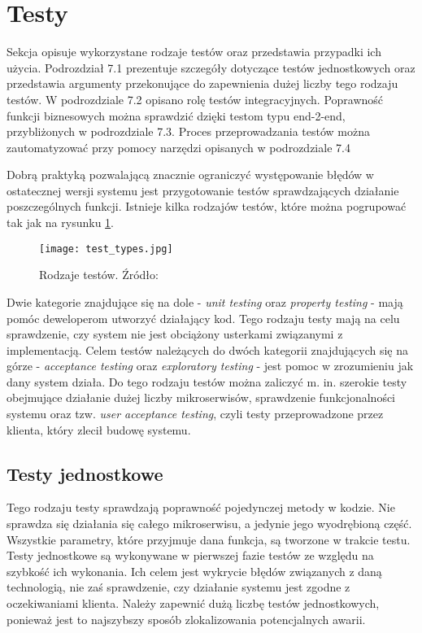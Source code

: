 \newpage
\section{Testy}
Sekcja opisuje wykorzystane rodzaje testów oraz przedstawia przypadki ich użycia.
Podrozdział 7.1 prezentuje szczegóły dotyczące testów jednostkowych oraz
przedstawia argumenty przekonujące do zapewnienia dużej liczby tego rodzaju testów.
W podrozdziale 7.2 opisano rolę testów integracyjnych. Poprawność funkcji biznesowych
można sprawdzić dzięki testom typu end-2-end, przybliżonych w podrozdziale 7.3.
Proces przeprowadzania testów można zautomatyzować przy pomocy narzędzi opisanych
w podrozdziale 7.4

Dobrą praktyką pozwalającą znacznie ograniczyć występowanie błędów w ostatecznej 
wersji systemu jest przygotowanie testów sprawdzających działanie poszczególnych 
funkcji. Istnieje kilka rodzajów testów, które można pogrupować tak jak na rysunku
\ref{fig:test-types}.

\begin{figure}[h]
    \centering
    \texttt{[image: test\_types.jpg]}
    \caption{Rodzaje testów. Źródło: \cite{newman2015}}
    \label{fig:test-types}
\end{figure}

Dwie kategorie znajdujące się na dole - \textit{unit testing} oraz \textit{property testing} - mają 
pomóc deweloperom utworzyć działający kod. Tego rodzaju testy mają na celu 
sprawdzenie, czy system nie jest obciążony usterkami związanymi z implementacją. 
Celem testów należących do dwóch kategorii znajdujących się na górze - \textit{acceptance 
testing} oraz \textit{exploratory testing} - jest pomoc w zrozumieniu jak dany system działa. 
Do tego rodzaju testów można zaliczyć m. in. szerokie testy obejmujące działanie dużej 
liczby mikroserwisów, sprawdzenie funkcjonalności systemu oraz tzw. \textit{user acceptance 
testing}, czyli testy przeprowadzone przez klienta, który zlecił budowę systemu.

\subsection{Testy jednostkowe}

Tego rodzaju testy sprawdzają poprawność pojedynczej metody w kodzie. Nie sprawdza się działania 
się całego mikroserwisu, a jedynie jego wyodrębioną część. Wszystkie parametry, które 
przyjmuje dana funkcja, są tworzone w trakcie testu. Testy jednostkowe są wykonywane 
w pierwszej fazie testów ze względu na szybkość ich wykonania. Ich celem jest wykrycie 
błędów związanych z daną technologią, nie zaś sprawdzenie, czy działanie systemu jest 
zgodne z oczekiwaniami klienta. Należy zapewnić dużą liczbę testów 
jednostkowych, ponieważ jest to najszybszy sposób zlokalizowania potencjalnych awarii.

